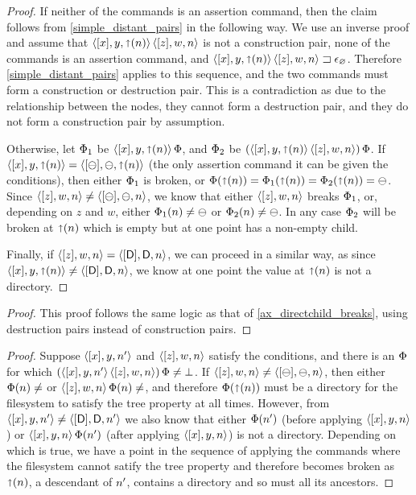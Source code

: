 \begin{proof}
If neither of the commands is an assertion command, then the claim follows from
\cref{simple_distant_pairs} in the following way.
We use an inverse proof and assume that $\langle{[x],y,\mathord{\shortuparrow}({n})}\rangle\,\langle{[z],w,n}\rangle$ is not a construction pair,
none of the commands is an assertion command, and ${\langle{[x],y,\mathord{\shortuparrow}({n})}\rangle\,\langle{[z],w,n}\rangle}\sqsupset\epsilon_\varnothing$.
Therefore \cref{simple_distant_pairs} applies to this sequence, and the two commands
must form a construction or destruction pair. This is a contradiction as due to
the relationship between the nodes, they cannot form a destruction pair, and
they do not form a construction pair by assumption.

Otherwise, let $\Phi_1$ be $\langle{[x],y,\mathord{\shortuparrow}({n})}\rangle\,\Phi$, and $\Phi_2$ be $(\langle{[x],y,\mathord{\shortuparrow}({n})}\rangle\,\langle{[z],w,n}\rangle)\,\Phi$.
If $\langle{[x],y,\mathord{\shortuparrow}({n})}\rangle=\langle{[\ominus],\ominus,\mathord{\shortuparrow}({n})}\rangle$ (the only assertion command it can be given the conditions),
then either $\Phi_1$ is broken, or
$\Phi(\mathord{\shortuparrow}({n}))=\Phi_1(\mathord{\shortuparrow}({n}))=\Phi_2(\mathord{\shortuparrow}({n}))=\ominus$.
Since $\langle{[z],w,n}\rangle\neq\langle{[\ominus],\ominus,n}\rangle$, we know that either $\langle{[z],w,n}\rangle$ breaks $\Phi_1$,
or, depending on $z$ and $w$, either $\Phi_1(n)\neq\ominus$ or $\Phi_2(n)\neq\ominus$.
In any case $\Phi_2$ will be broken at $\mathord{\shortuparrow}({n})$ which is empty but at one point has a non-empty child.

Finally, if $\langle{[z],w,n}\rangle=\langle{[\mathsf{D}],\mathsf{D},n}\rangle$, we can proceed in a similar way,
as since $\langle{[x],y,\mathord{\shortuparrow}({n})}\rangle\neq\langle{[\mathsf{D}],\mathsf{D},n}\rangle$, we know at one point the value at $\mathord{\shortuparrow}({n})$ is not a directory.
\end{proof}

\begin{myaxproof}
\axaxdirectparentbreaks
\end{myaxproof}

\begin{proof}
This proof follows the same logic as that of \cref{ax_directchild_breaks},
using destruction pairs instead of construction pairs.
\end{proof}

\begin{myaxproof}
\axaxdistantrelbreaks
\end{myaxproof}

\begin{proof}
Suppose $\langle{[x],y,n'}\rangle$ and $\langle{[z],w,n}\rangle$ satisfy the conditions,
and there is an $\Phi$ for which $(\langle{[x],y,n'}\rangle\,\langle{[z],w,n}\rangle)\,\Phi\neq\bot$.
If $\langle{[z],w,n}\rangle\neq\langle{[\ominus],\ominus,n}\rangle$, then either $\FS(n)\neq\empty$ or $\czwnv\aFS(n)\neq\empty$,
and therefore $\Phi(\mathord{\shortuparrow}({n}))$ must be a directory for the filesystem to satisfy
the tree property at all times.
However, from $\langle{[x],y,n'}\rangle\neq\langle{[\mathsf{D}],\mathsf{D},n'}\rangle$ we also know that either $\Phi(n')$ 
(before applying $\langle{[x],y,n}\rangle$) or $\langle{[x],y,n}\rangle\,\Phi(n')$ (after applying $\langle{[x],y,n}\rangle$)
is not a directory. Depending on which is true, we have a point in the sequence
of applying the commands where the filesystem cannot satify the tree property
and therefore becomes broken as $\mathord{\shortuparrow}({n})$, a descendant of $n'$, contains
a directory and so must all its ancestors.
\end{proof}

